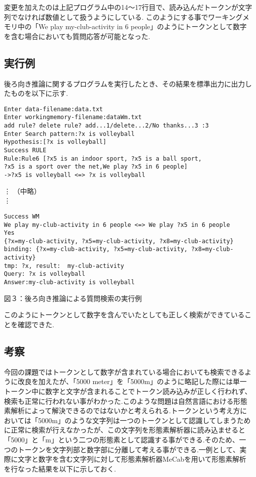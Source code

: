 \documentclass[a4j]{jarticle}
\begin{document}
\begin{verbatim}

\end{verbatim}
変更を加えたのは上記プログラム中の14〜17行目で、読み込んだトークンが文字列でなければ数値として扱うようにしている.
このようにする事でワーキングメモリ中の「We play my-club-activity in 6 people」のようにトークンとして数字を含む場合においても質問応答が可能となった.

\subsection{実行例}
後ろ向き推論に関するプログラムを実行したとき、その結果を標準出力に出力したものを以下に示す.\\

\begin{screen}
\begin{verbatim}
Enter data-filename:data.txt
Enter workingmemory-filename:dataWm.txt
add rule? delete rule? add...1/delete...2/No thanks...3 :3
Enter Search pattern:?x is volleyball
Hypothesis:[?x is volleyball]
Success RULE
Rule:Rule6 [?x5 is an indoor sport, ?x5 is a ball sport, 
?x5 is a sport over the net,We play ?x5 in 6 people]
->?x5 is volleyball <=> ?x is volleyball
\end{verbatim}
\vdots
（中略）\\
\vdots
\begin{verbatim}
Success WM
We play my-club-activity in 6 people <=> We play ?x5 in 6 people
Yes
{?x=my-club-activity, ?x5=my-club-activity, ?x8=my-club-activity}
binding: {?x=my-club-activity, ?x5=my-club-activity, ?x8=my-club-activity}
tmp: ?x, result:  my-club-activity
Query: ?x is volleyball
Answer:my-club-activity is volleyball
\end{verbatim}
\end{screen}
\begin{center}
図３：後ろ向き推論による質問検索の実行例\\
\end{center}

このようにトークンとして数字を含んでいたとしても正しく検索ができていることを確認できた.
\subsection{考察}
今回の課題ではトークンとして数字が含まれている場合においても検索できるように改良を加えたが、「5000 meter」を「5000m」のように略記した際には単一トークン中に数字と文字が含まれることでトークン読み込みが正しく行われず、検索も正常に行われない事がわかった.このような問題は自然言語における形態素解析によって解決できるのではないかと考えられる.トークンという考え方においては「5000m」のような文字列は一つのトークンとして認識してしまうために正常に検索が行えなかったが、この文字列を形態素解析器に読み込ませると「5000」と「m」という二つの形態素として認識する事ができる.そのため、一つのトークンを文字列部と数字部に分離して考える事ができる.一例として、実際に文字と数字を含む文字列に対して形態素解析器MeCabを用いて形態素解析を行なった結果を以下に示しておく.\\
\end{document}
